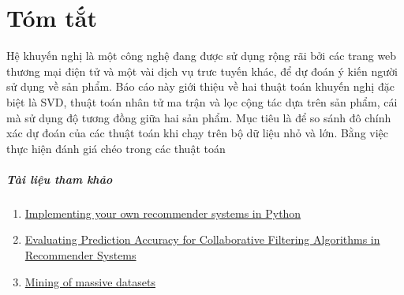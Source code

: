 \documentclass[a4paper,12pt]{book}
\makeatletter
\def\cleardoublepage{\clearpage\if@twoside \ifodd\c@page\else%
  \hbox{}%
  \thispagestyle{empty}%
  \newpage%
  \if@twocolumn\hbox{}\newpage\fi\fi\fi}
\theoremstyle{break}
\makeatother
\begin{document}

\frontmatter

\chapter*{Tóm tắt}
Hệ khuyến nghị là một công nghệ đang được sử dụng rộng rãi bởi các trang web thương mại điện tử và một vài dịch vụ trưc tuyến khác, để dự đoán ý kiến người sử dụng về sản phẩm. Báo cáo này giới thiệu về hai thuật toán khuyến nghị đặc biệt là SVD, thuật toán nhân tử ma trận và lọc cộng tác dựa trên sản phẩm, cái mà sử dụng độ tương đồng giữa hai sản phẩm. Mục tiêu là để so sánh đô chính xác dự đoán của các thuật toán khi chạy trên bộ dữ liệu nhỏ và lớn. Bằng việc thực hiện đánh giá chéo trong các thuật toán

\clearpage
\tableofcontents

\clearpage
\listoffigures

\clearpage
\listoftables


\mainmatter
\pagestyle{fancy}

\cleardoublepage







\appendix

%
%

\paragraph{\textbf{Tài liệu tham khảo}}
\begin{enumerate}[1.]
	\item \href{https://cambridgespark.com/content/tutorials/implementing-your-own-recommender-systems-in-Python/index.html}{Implementing your own recommender systems in Python}
	\item \href{https://kth.diva-portal.org/smash/get/diva2:927356/FULLTEXT01.pdf}{Evaluating Prediction Accuracy for Collaborative Filtering Algorithms in Recommender Systems}
	\item \href{http://www.mmds.org/}{Mining of massive datasets}
\end{enumerate}
\end{document}
